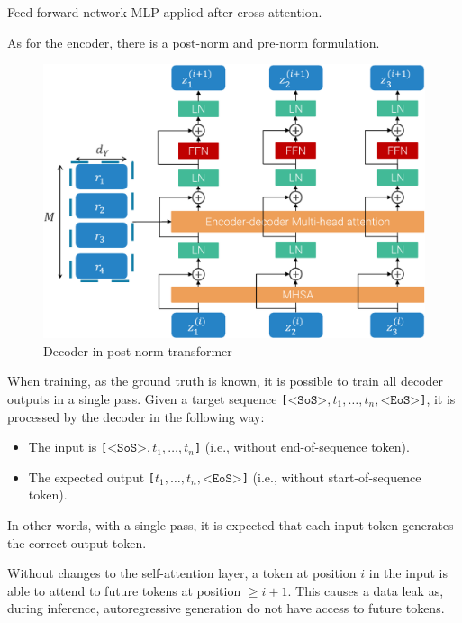 \begin{description}
\begin{descriptionlist}
            \item[Feed-forward network]
                MLP applied after cross-attention.
        \end{descriptionlist}

        \begin{remark}
            As for the encoder, there is a post-norm and pre-norm formulation.
        \end{remark}

        \begin{figure}[H]
            \centering
            \includegraphics[width=0.5\linewidth]{./img/_transformer_decoder.pdf}
            \caption{Decoder in post-norm transformer}
        \end{figure}


    \item[Parallel training]
        When training, as the ground truth is known, it is possible to train all decoder outputs in a single pass. Given a target sequence \texttt{[$\texttt{<SoS>}, t_1, \dots, t_n, \texttt{<EoS>}$]}, it is processed by the decoder in the following way:
        \begin{itemize}
            \item The input is \texttt{[$\texttt{<SoS>}, t_1, \dots, t_n$]} (i.e., without end-of-sequence token).
            \item The expected output \texttt{[$t_1, \dots, t_n, \texttt{<EoS>}$]} (i.e., without start-of-sequence token).
        \end{itemize}
        In other words, with a single pass, it is expected that each input token generates the correct output token.

        \begin{remark}
            Without changes to the self-attention layer, a token at position $i$ in the input is able to attend to future tokens at position $\geq i+1$. This causes a data leak as, during inference, autoregressive generation do not have access to future tokens.
        \end{remark}


\end{description}
